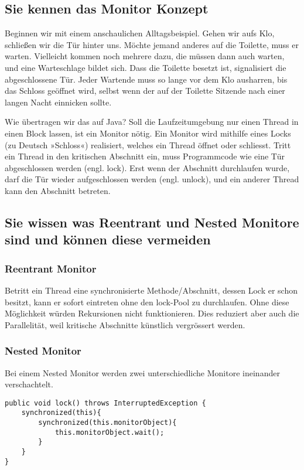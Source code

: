 \subsection{Sie kennen das Monitor Konzept}

Beginnen wir mit einem anschaulichen Alltagsbeispiel. Gehen wir aufs Klo, schließen wir die Tür hinter uns. Möchte jemand anderes auf die Toilette, muss er warten. Vielleicht kommen noch mehrere dazu, die müssen dann auch warten, und eine Warteschlage bildet sich. Dass die Toilette besetzt ist, signalisiert die abgeschlossene Tür. Jeder Wartende muss so lange vor dem Klo ausharren, bis das Schloss geöffnet wird, selbst wenn der auf der Toilette Sitzende nach einer langen Nacht einnicken sollte.

Wie übertragen wir das auf Java? Soll die Laufzeitumgebung nur einen Thread in einen Block lassen, ist ein Monitor nötig. Ein Monitor wird mithilfe eines Locks (zu Deutsch »Schloss«) realisiert, welches ein Thread öffnet oder schliesst. Tritt ein Thread in den kritischen Abschnitt ein, muss Programmcode wie eine Tür abgeschlossen werden (engl. lock). Erst wenn der Abschnitt durchlaufen wurde, darf die Tür wieder aufgeschlossen werden (engl. unlock), und ein anderer Thread kann den Abschnitt betreten.


\subsection{Sie wissen was Reentrant und Nested Monitore sind und können diese vermeiden}

\subsubsection{Reentrant Monitor}

Betritt ein Thread eine synchronisierte Methode/Abschnitt, dessen Lock er schon besitzt, kann er sofort eintreten ohne den lock-Pool zu durchlaufen. Ohne diese Möglichkeit würden Rekursionen nicht funktionieren. Dies reduziert aber auch die Parallelität, weil kritische Abschnitte künstlich vergrössert werden.

\subsubsection{Nested Monitor}

Bei einem Nested Monitor werden zwei unterschiedliche Monitore ineinander verschachtelt.

\begin{lstlisting}[caption={Nested Monitor},label=lst:nested_monitor]
public void lock() throws InterruptedException {
	synchronized(this){
		synchronized(this.monitorObject){
			this.monitorObject.wait();
		}
	}
}	  
\end{lstlisting}

